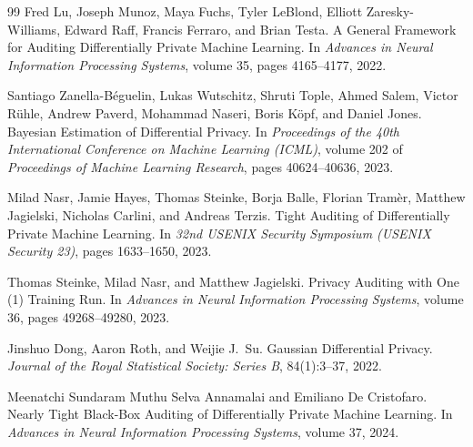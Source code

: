 \documentclass[10pt]{article}
\begin{document}
\begin{thebibliography}{99}
Fred Lu, Joseph Munoz, Maya Fuchs, Tyler LeBlond, Elliott Zaresky-Williams, Edward Raff, Francis Ferraro, and Brian Testa.
\newblock A General Framework for Auditing Differentially Private Machine Learning.
\newblock In \emph{Advances in Neural Information Processing Systems}, volume 35, pages 4165--4177, 2022.

Santiago Zanella-B\'eguelin, Lukas Wutschitz, Shruti Tople, Ahmed Salem, Victor R\"uhle, Andrew Paverd, Mohammad Naseri, Boris K\"opf, and Daniel Jones.
\newblock Bayesian Estimation of Differential Privacy.
\newblock In \emph{Proceedings of the 40th International Conference on Machine Learning (ICML)}, volume 202 of \emph{Proceedings of Machine Learning Research}, pages 40624--40636, 2023.

Milad Nasr, Jamie Hayes, Thomas Steinke, Borja Balle, Florian Tram\`er, Matthew Jagielski, Nicholas Carlini, and Andreas Terzis.
\newblock Tight Auditing of Differentially Private Machine Learning.
\newblock In \emph{32nd USENIX Security Symposium (USENIX Security 23)}, pages 1633--1650, 2023.

Thomas Steinke, Milad Nasr, and Matthew Jagielski.
\newblock Privacy Auditing with One (1) Training Run.
\newblock In \emph{Advances in Neural Information Processing Systems}, volume 36, pages 49268--49280, 2023.

Jinshuo Dong, Aaron Roth, and Weijie J.~Su.
\newblock Gaussian Differential Privacy.
\newblock \emph{Journal of the Royal Statistical Society: Series B}, 84(1):3--37, 2022.

Meenatchi Sundaram Muthu Selva Annamalai and Emiliano De Cristofaro.
\newblock Nearly Tight Black-Box Auditing of Differentially Private Machine Learning.
\newblock In \emph{Advances in Neural Information Processing Systems}, volume 37, 2024.

\end{thebibliography}
\end{document}

